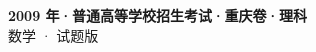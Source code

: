 \documentclass[zihao=-4, a4paper]{ctexart}
\begin{document}
\begin{center}
  {\Large\bfseries 2009 年·普通高等学校招生考试·重庆卷·理科}\\[4pt]
  {\large 数学 · 试题版}
\end{center}
\medskip
{}

\end{document}
